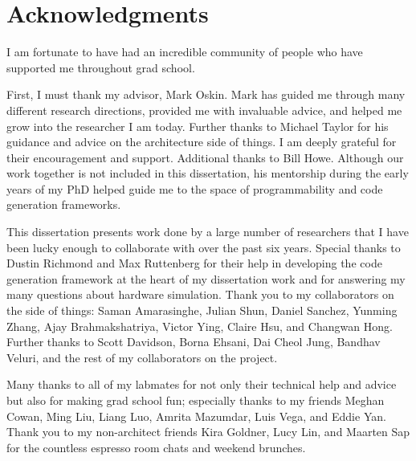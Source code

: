 
\bigskip

\begingroup
\let\clearpage\relax
\let\cleardoublepage\relax
\let\cleardoublepage\relax
\chapter*{Acknowledgments}



I am fortunate to have had an incredible community of people who have supported me throughout grad school. %

First, I must thank my advisor, Mark Oskin.
Mark has guided me through many different research directions, provided me with invaluable advice, and helped me grow into the researcher I am today.
Further thanks to Michael Taylor for his guidance and advice on the architecture side of things.
I am deeply grateful for their encouragement and support. 
Additional thanks to Bill Howe.
Although our work together is not included in this dissertation, his mentorship during the early years of my PhD helped guide me to the space of programmability and code generation frameworks.

This dissertation presents work done by a large number of researchers that I have been lucky enough to collaborate with over the past six years.
Special thanks to Dustin Richmond and Max Ruttenberg for their help in developing the code generation framework at the heart of my dissertation work and for answering my many questions about hardware simulation.
Thank you to my collaborators on the \graphit side of things: Saman Amarasinghe, Julian Shun, Daniel Sanchez, Yunming Zhang, Ajay Brahmakshatriya, Victor Ying, Claire Hsu, and Changwan Hong.
Further thanks to Scott Davidson, Borna Ehsani, Dai Cheol Jung, Bandhav Veluri, and the rest of my collaborators on the \hb project. 

Many thanks to all of my labmates for not only their technical help and advice but also for making grad school fun; 
especially thanks to my friends Meghan Cowan, Ming Liu, Liang Luo, Amrita Mazumdar, Luis Vega, and Eddie Yan.
Thank you to my non-architect friends Kira Goldner, Lucy Lin, and Maarten Sap for the countless espresso room chats and weekend brunches.


